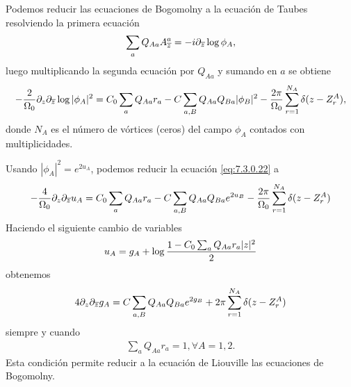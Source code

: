 Podemos reducir las ecuaciones de Bogomolny a la ecuación de Taubes resolviendo la primera ecuación
\begin{align}
	\sum_a Q_{Aa}A_{\overline z}^a = -i\partial_{\overline z}\log\phi_A,
\end{align}
luego multiplicando la segunda ecuación por $Q_{Aa}$ y sumando en $a$ se obtiene
\begin{align}
	-\frac{2}{\Omega_0}\partial_z\partial_{\overline z}\log |\phi_A|^2 = C_0\sum_a Q_{Aa}r_a-C\sum_{a,B}Q_{Aa}Q_{Ba}|\phi_B|^2-\frac{2\pi}{\Omega_0}\sum_{r=1}^{N_A}\delta(z-Z_r^A), \label{eq:7.3.0.22}
\end{align}
donde $N_A$ es el número de vórtices (ceros) del campo $\phi_A$ contados con multiplicidades.

Usando $|\phi_A|^2=e^{2u_A}$, podemos reducir la ecuación \eqref{eq:7.3.0.22} a
\begin{align}
	-\frac{4}{\Omega_0}\partial_z\partial_{\overline z}u_A = C_0\sum_a Q_{Aa}r_a-C\sum_{a,B}Q_{Aa}Q_{Ba}e^{2u_B}-\frac{2\pi}{\Omega_0}\sum_{r=1}^{N_A}\delta(z-Z_r^A)
\end{align}
Haciendo el siguiente cambio de variables
\begin{align}
	u_A = g_A+\log\frac{1-C_0\sum_aQ_{Aa}r_a|z|^2}{2}
\end{align}
obtenemos
\begin{align}
	4\partial_z\partial_{\overline z}g_A = C\sum_{a,B}Q_{Aa}Q_{Ba}e^{2g_B}+2\pi\sum_{r=1}^{N_A}\delta(z-Z_r^A)
\end{align}
siempre y cuando
\begin{align}
	\sum_a Q_{Aa}r_a = 1, \forall A=1,2.
\end{align}
Esta condición permite reducir a la ecuación de Liouville las ecuaciones de Bogomolny.

